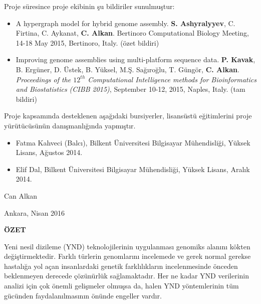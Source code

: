 \documentclass[11pt]{article}
\begin{document}
Proje süresince proje ekibinin şu bildiriler sunulmuştur:
 
\begin{itemize}
\item A hypergraph model for hybrid genome assembly. {\bf S. Ashyralyyev}, C. Firtina, C. Aykanat, {\bf C. Alkan}. Bertinoro Computational Biology Meeting, 14-18 May 2015, Bertinoro, Italy. (özet bildiri)
\item Improving genome assemblies using multi-platform sequence data.
{\bf P. Kavak}, B. Ergüner, D. Üstek, B. Yüksel, M.Ş. Sağıroğlu, T. Güngör, {\bf C. Alkan}.
{\em Proceedings of the $12^{th}$ Computational Intelligence methods for Bioinformatics and Biostatistics (CIBB 2015)}, 
 September 10-12, 2015, Naples, Italy. (tam bildiri)
\end{itemize}

Proje kapsamında desteklenen aşağıdaki bursiyerler,  lisansüstü eğitimlerini 
proje yürütücüsünün danışmanlığında
yapmıştır.
 
\begin{itemize}
\item Fatma Kahveci (Balcı), Bilkent Üniversitesi Bilgisayar Mühendisliği, Yüksek Lisans, Ağustos 2014.
\item Elif Dal, Bilkent Üniversitesi Bilgisayar Mühendisliği, Yüksek Lisans, Aralık 2014.
\end{itemize}


\bigskip
\hfill Can Alkan

\hfill Ankara, Nisan 2016
\newpage

\setlength{\parskip}{1mm} 

\tableofcontents
\listoffigures
\listoftables



\newpage \setlength{\parskip}{3mm}
\phantom{ss}
\vspace{-2.5cm}

\begin{center}
{\bf \Large ÖZET} 
\end{center}
\noindent

Yeni nesil dizileme (YND) teknolojilerinin uygulanması genomiks alanını kökten değiştirmektedir. Farklı türlerin genomlarını incelemede ve gerek normal gerekse hastalığa yol açan insanlardaki genetik farklılıkların incelenmesinde önceden beklenmeyen derecede çözünürlük sağlamaktadır. Her ne kadar YND verilerinin analizi için çok önemli gelişmeler olmuşsa da, halen YND yöntemlerinin tüm gücünden faydalanılmasının önünde engeller vardır.
\end{document}
